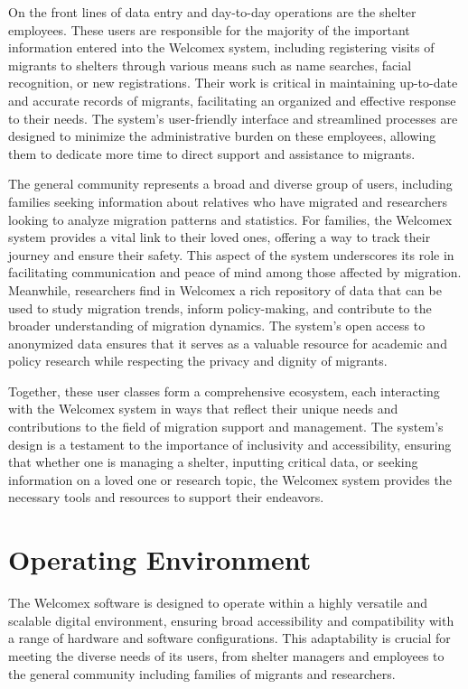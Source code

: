 \documentclass{scrreprt}
\begin{document}
On the front lines of data entry and day-to-day operations are the shelter employees. These users are responsible for the majority of the important information entered into the Welcomex system, including registering visits of migrants to shelters through various means such as name searches, facial recognition, or new registrations. Their work is critical in maintaining up-to-date and accurate records of migrants, facilitating an organized and effective response to their needs. The system's user-friendly interface and streamlined processes are designed to minimize the administrative burden on these employees, allowing them to dedicate more time to direct support and assistance to migrants.

The general community represents a broad and diverse group of users, including families seeking information about relatives who have migrated and researchers looking to analyze migration patterns and statistics. For families, the Welcomex system provides a vital link to their loved ones, offering a way to track their journey and ensure their safety. This aspect of the system underscores its role in facilitating communication and peace of mind among those affected by migration. Meanwhile, researchers find in Welcomex a rich repository of data that can be used to study migration trends, inform policy-making, and contribute to the broader understanding of migration dynamics. The system's open access to anonymized data ensures that it serves as a valuable resource for academic and policy research while respecting the privacy and dignity of migrants.

Together, these user classes form a comprehensive ecosystem, each interacting with the Welcomex system in ways that reflect their unique needs and contributions to the field of migration support and management. The system's design is a testament to the importance of inclusivity and accessibility, ensuring that whether one is managing a shelter, inputting critical data, or seeking information on a loved one or research topic, the Welcomex system provides the necessary tools and resources to support their endeavors.

\section{Operating Environment}
The Welcomex software is designed to operate within a highly versatile and scalable digital environment, ensuring broad accessibility and compatibility with a range of hardware and software configurations. This adaptability is crucial for meeting the diverse needs of its users, from shelter managers and employees to the general community including families of migrants and researchers.
\end{document}
